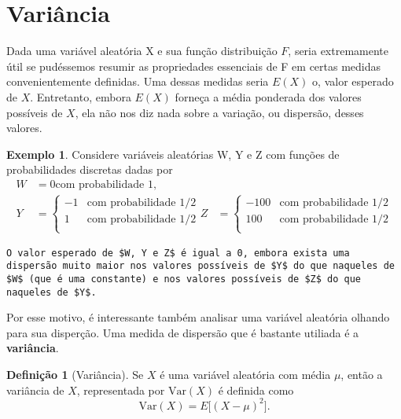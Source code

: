 \documentclass[]{book}
\theoremstyle{definition}
\newtheorem{definition}{Definição}[chapter]
\theoremstyle{definition}
\newtheorem{example}{Exemplo}[chapter]
\theoremstyle{definition}
\theoremstyle{remark}
\begin{document}
\hypertarget{variuxe2ncia}{%
\section{Variância}\label{variuxe2ncia}}

Dada uma variável aleatória X e sua função distribuição \(F\), seria extremamente útil se pudéssemos resumir as propriedades essenciais de F em certas medidas convenientemente definidas.
Uma dessas medidas seria \(E(X)\) o, valor esperado de \(X\).
Entretanto, embora \(E(X)\) forneça a média ponderada dos valores possíveis de \(X\), ela não nos diz nada sobre a variação, ou dispersão, desses valores.

\begin{example}
\protect\hypertarget{exm:unnamed-chunk-176}{}{\label{exm:unnamed-chunk-176} }Considere variáveis aleatórias W, Y e Z com funções de probabilidades discretas dadas por
\begin{align}
  W &= 0 \text{com probabilidade } 1,\\
  Y &= \left\{
      \begin{array}{ll}
            -1 & \text{com probabilidade } 1/2\\
            1 & \text{com probabilidade } 1/2\\
         \end{array} 
      \right.
  Z &= \left\{
      \begin{array}{ll}
            -100 & \text{com probabilidade } 1/2\\
            100 & \text{com probabilidade } 1/2\\
         \end{array} 
      \right.
\end{align}

\begin{verbatim}
O valor esperado de $W, Y e Z$ é igual a 0, embora exista uma dispersão muito maior nos valores possíveis de $Y$ do que naqueles de $W$ (que é uma constante) e nos valores possíveis de $Z$ do que naqueles de $Y$.
\end{verbatim}
\end{example}

Por esse motivo, é interessante também analisar uma variável aleatória olhando para sua disperção.
Uma medida de dispersão que é bastante utiliada é a \textbf{variância}.

\begin{definition}[Variância]
\protect\hypertarget{def:unnamed-chunk-177}{}{\label{def:unnamed-chunk-177} \iffalse (Variância) \fi{} }Se \(X\) é uma variável aleatória com média \(\mu\), então a variância de \(X\), representada por \(\mathrm{Var}(X)\) é definida como
\[\mathrm{Var}(X) = E\big[(X-\mu)^2\big].\]
\end{definition}
\end{document}
